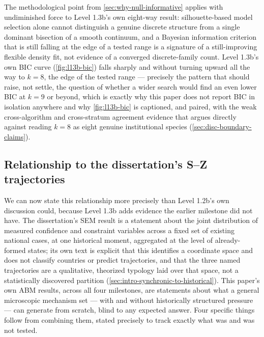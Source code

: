 The methodological point from \cref{sec:why-null-informative} applies with
undiminished force to Level 1.3b's own eight-way result: silhouette-based
model selection alone cannot distinguish a genuine discrete structure from
a single dominant bisection of a smooth continuum, and a Bayesian
information criterion that is still falling at the edge of a tested range
is a signature of a still-improving flexible density fit, not evidence of
a converged discrete-family count. Level 1.3b's own BIC curve
(\cref{fig:l13b-bic}) falls sharply and without turning upward all the way
to $k{=}8$, the edge of the tested range --- precisely the pattern that
should raise, not settle, the question of whether a wider search would
find an even lower BIC at $k{=}9$ or beyond, which is exactly why this
paper does not report BIC in isolation anywhere and why
\cref{fig:l13b-bic} is captioned, and paired, with the weak cross-algorithm
and cross-stratum agreement evidence that argues directly against reading
$k{=}8$ as eight genuine institutional species (\cref{sec:disc-boundary-claims}).

\subsection{Relationship to the dissertation's S--Z trajectories}
\label{sec:disc-relationship-to-dissertation}

We can now state this relationship more precisely than Level 1.2b's own
discussion could, because Level 1.3b adds evidence the earlier milestone
did not have. The dissertation's SEM result is a statement about the joint
distribution of measured confidence and constraint variables across a
fixed set of existing national cases, at one historical moment, aggregated
at the level of already-formed states; its own text is explicit that this
identifies a coordinate space and does not classify countries or predict
trajectories, and that the three named trajectories are a qualitative,
theorized typology laid over that space, not a statistically discovered
partition (\cref{sec:intro-synchronic-to-historical}). This paper's own
ABM results, across all four milestones, are statements about what a
general microscopic mechanism set --- with and without historically
structured pressure --- can generate from scratch, blind to any expected
answer. Four specific things follow from combining them, stated precisely
to track exactly what was and was not tested.

